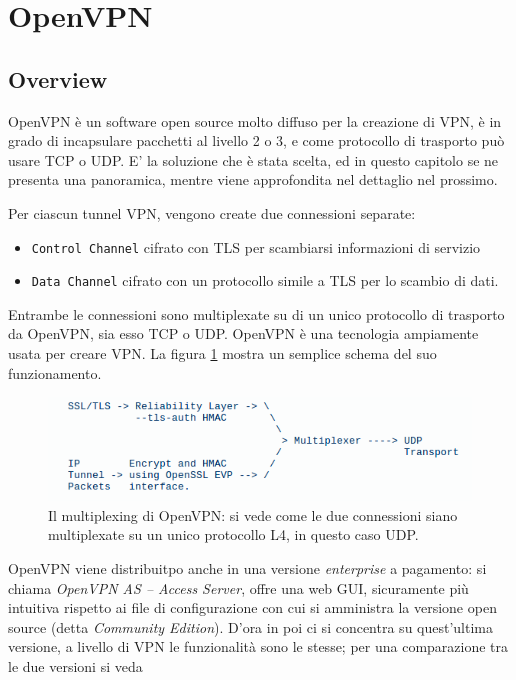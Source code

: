 \section{OpenVPN}
\subsection{Overview}
OpenVPN è un software open source molto diffuso per la creazione di VPN,
è in grado di incapsulare pacchetti al livello 2 o 3, e come protocollo di trasporto
può usare TCP o UDP. E' la soluzione che è stata scelta, ed in questo capitolo
se ne presenta una panoramica, mentre viene approfondita nel dettaglio
nel prossimo.


Per ciascun tunnel VPN, vengono create due connessioni separate:
\begin{itemize}
  \item \texttt{Control Channel} cifrato con TLS per scambiarsi informazioni di servizio
  \item \texttt{Data Channel} cifrato con un protocollo simile  a TLS per lo scambio
  di dati.
\end{itemize}
Entrambe le connessioni sono multiplexate su di un unico protocollo di trasporto
da OpenVPN, sia esso TCP o UDP.
OpenVPN è una tecnologia ampiamente usata per creare VPN.
La figura \ref{fig:openvpn-sec} mostra un semplice schema del suo funzionamento.\\
\begin{figure}[h!]
  \includegraphics[scale=0.4]{img/openvpn_sec}
  \caption[Il multiplexing di OpenVPN]{Il multiplexing di OpenVPN: si vede come
  le due connessioni siano multiplexate su un unico protocollo L4, in questo caso UDP.}
  \label{fig:openvpn-sec}
\end{figure}
OpenVPN viene distribuitpo anche in una versione \textit{enterprise} a pagamento: si chiama
\textit{OpenVPN AS -- Access Server}, offre una web GUI, sicuramente più intuitiva
rispetto ai file di configurazione con cui si amministra la versione open source
(detta \textit{Community Edition}). D'ora in poi ci si concentra su quest'ultima
versione, a livello di VPN le funzionalità sono le stesse; per una comparazione tra
le due versioni si veda
